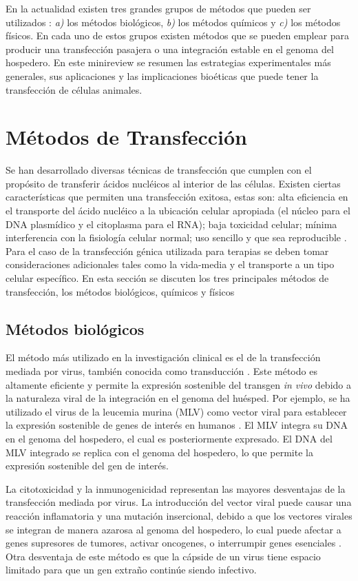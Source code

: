 \documentclass[fleqn,10pt]{SelfArx} %
\begin{document}
En la actualidad existen tres grandes grupos de métodos que pueden ser utilizados \cite{Kim:2010aa}: \textit{a)} los métodos biológicos, \textit{b)} los métodos químicos y \textit{c)} los métodos físicos. En cada uno de estos grupos existen métodos que se pueden emplear para producir una transfección pasajera o una integración estable en el genoma del hospedero. En este minireview se resumen las estrategias experimentales más generales, sus aplicaciones y las implicaciones bioéticas que puede tener la transfección de células animales.

\section{Métodos de Transfección}
Se han desarrollado diversas técnicas de transfección que cumplen con el propósito de transferir ácidos nucléicos al interior de las células. Existen ciertas características que permiten una transfección exitosa, estas son: alta eficiencia en el transporte del ácido nucléico a la ubicación celular apropiada (el núcleo para el DNA plasmídico y el citoplasma para el RNA); baja toxicidad celular; mínima interferencia con la fisiología celular normal; uso sencillo y que sea reproducible \cite{Schenborn}. Para el caso de la transfección génica utilizada para terapias se deben tomar consideraciones adicionales tales como la vida-media y el transporte a un tipo celular específico. En esta sección se discuten los tres principales métodos de transfección, los métodos biológicos, químicos y físicos

\subsection{Métodos biológicos}
El método más utilizado en la investigación clinical es el de la transfección mediada por virus, también conocida como transducción \cite{Pfeifer:2001aa}. Este método es altamente eficiente y permite la expresión sostenible del transgen \textit{in vivo} debido a la naturaleza viral de la integración en el genoma del huésped. Por ejemplo, se ha utilizado el virus de la leucemia murina (MLV)  como vector viral para establecer la expresión sostenible de genes de interés en humanos \cite{Hacein-Bey-Abina:2002aa, Roesler:2002aa}. El MLV integra su DNA en el genoma del hospedero, el cual es posteriormente expresado. El DNA del MLV integrado se replica con el genoma del hospedero, lo que permite la expresión sostenible del gen de interés.

La citotoxicidad y la inmunogenicidad representan las mayores desventajas de la transfección mediada por virus. La introducción del vector viral puede causar una reacción inflamatoria y una mutación insercional, debido a que los vectores virales se integran de manera azarosa al genoma del hospedero, lo cual puede afectar a genes supresores de tumores, activar oncogenes, o interrumpir genes esenciales \cite{Woods:2003aa}. Otra desventaja de este método es que la cápside de un virus tiene espacio limitado para que un gen extraño continúe siendo infectivo. 
\end{document}
